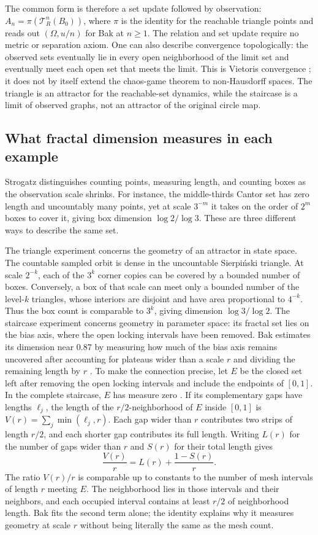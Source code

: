 \documentclass[11pt]{article}
\begin{document}
The common form is therefore a set update followed by observation: $A_n=\pi(\mathcal T_R^n(B_0))$,
where $\pi$ is the identity for the reachable triangle points and reads out $(\Omega,u/n)$ for Bak at $n\ge1$.
The relation and set update require no metric or separation axiom.
One can also describe convergence topologically: the observed sets eventually lie in every open neighborhood
of the limit set and eventually meet each open set that meets the limit.
This is Vietoris convergence \cite[Section~2]{barnsley-transformations}; it does not by itself extend the chaos-game theorem to non-Hausdorff spaces.
The triangle is an attractor for the reachable-set dynamics, while the staircase is a limit of observed graphs,
not an attractor of the original circle map.

\subsection{What fractal dimension measures in each example}

Strogatz \cite[Sections~11.1--11.4]{strogatz} distinguishes counting points, measuring length, and counting boxes as
the observation scale shrinks.
For instance, the middle-thirds Cantor set has zero length and uncountably many points, yet at scale $3^{-m}$
it takes on the order of $2^m$ boxes to cover it, giving box dimension $\log 2/\log 3$.
These are three different ways to describe the same set.

The triangle experiment concerns the geometry of an attractor in state space.
The countable sampled orbit is dense in the uncountable Sierpi\'nski triangle.
At scale $2^{-k}$, each of the $3^k$ corner copies can be covered by a bounded number of boxes.
Conversely, a box of that scale can meet only a bounded number of the level-$k$ triangles, whose interiors
are disjoint and have area proportional to $4^{-k}$.
Thus the box count is comparable to $3^k$, giving dimension $\log 3/\log 2$.
The staircase experiment concerns geometry in parameter space: its fractal set lies on the bias axis, where
the open locking intervals have been removed.
Bak estimates its dimension near $0.87$ by measuring how much of the bias axis remains uncovered after accounting
for plateaus wider than a scale $r$ and dividing the remaining length by $r$ \cite[p.~44]{bak}.
To make the connection precise, let $E$ be the closed set left after removing the open locking intervals
and include the endpoints of $[0,1]$.
In the complete staircase, $E$ has measure zero \cite[p.~44]{bak}.
If its complementary gaps have lengths $\ell_j$, the length of the $r/2$-neighborhood of $E$ inside
$[0,1]$ is $V(r)=\sum_j\min(\ell_j,r)$.
Each gap wider than $r$ contributes two strips of length $r/2$, and each shorter gap contributes its full length.
Writing $L(r)$ for the number of gaps wider than $r$ and $S(r)$ for their total length gives
\[
\frac{V(r)}{r}=L(r)+\frac{1-S(r)}{r}.
\]
The ratio $V(r)/r$ is comparable up to constants to the number of mesh intervals of length $r$ meeting $E$.
The neighborhood lies in those intervals and their neighbors, and each occupied interval contains at least
$r/2$ of neighborhood length.
Bak fits the second term alone; the identity explains why it measures geometry at scale $r$ without being
literally the same as the mesh count.
\end{document}
